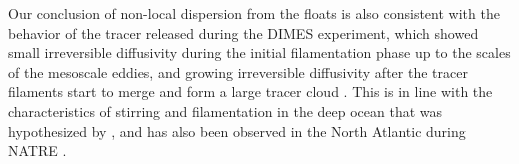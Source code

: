 \documentclass[]{ametsoc}
\begin{document}

Our conclusion of non-local dispersion from the floats is also consistent with the behavior of the tracer released during the DIMES experiment, which showed small irreversible diffusivity during the initial filamentation phase up to the scales of the mesoscale eddies, and growing irreversible diffusivity after the tracer filaments start to merge and form a large tracer cloud \citep{zika2020}. This is in line with the characteristics of stirring and filamentation in the deep ocean that was hypothesized by \citet{garrett1983initial}, and has also been observed in the North Atlantic during NATRE \citep{sundermeyer1998lateral}.



\end{document}
